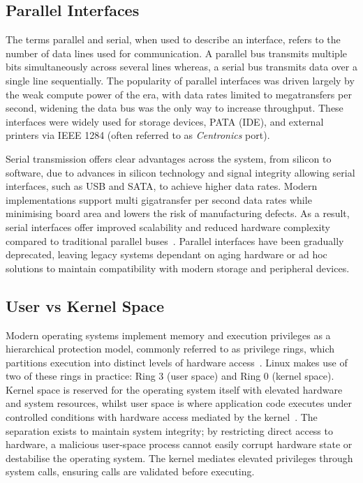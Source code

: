 \documentclass[final]{cmpreport}
\begin{document}
\subsection{Parallel Interfaces}
The terms parallel and serial, when used to describe an interface, refers to the number of data lines used for communication. A parallel bus transmits multiple bits simultaneously across several lines whereas, a serial bus transmits data over a single line sequentially. The popularity of parallel interfaces was driven largely by the weak compute power of the era, with data rates limited to megatransfers per second, widening the data bus was the only way to increase throughput. These interfaces were widely used for storage devices, PATA (IDE), and external printers via IEEE 1284 (often referred to as \textit{Centronics} port).

Serial transmission offers clear advantages across the system, from silicon to software, due to advances in silicon technology and signal integrity allowing serial interfaces, such as USB and SATA, to achieve higher data rates. Modern implementations support multi gigatransfer per second data rates while minimising board area and lowers the risk of manufacturing defects. As a result, serial interfaces offer improved scalability and reduced hardware complexity compared to traditional parallel buses~\cite{zotero-item-18}. Parallel interfaces have been gradually deprecated, leaving legacy systems dependant on aging hardware or ad hoc solutions to maintain compatibility with modern storage and peripheral devices.

\subsection{User vs Kernel Space}
Modern operating systems implement memory and execution privileges as a hierarchical protection model, commonly referred to as privilege rings, which partitions execution into distinct levels of hardware access~\cite{tanenbaumModernOperatingSystems2015}. Linux makes use of two of these rings in practice: Ring 3 (user space) and Ring 0 (kernel space). Kernel space is reserved for the operating system itself with elevated hardware and system resources, whilst user space is where application code executes under controlled conditions with hardware access mediated by the kernel~\cite{IntroductionLinuxKernel}. The separation exists to maintain system integrity; by restricting direct access to hardware, a malicious user-space process cannot easily corrupt hardware state or destabilise the operating system. The kernel mediates elevated privileges through system calls, ensuring calls are validated before executing.
\end{document}
